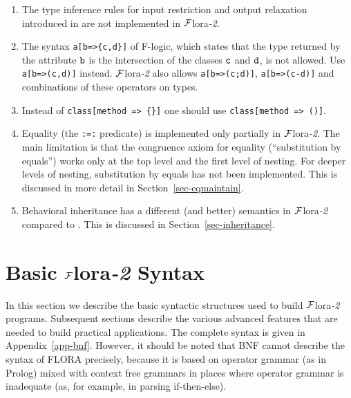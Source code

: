 \documentclass[11pt]{article}
\newcommand{\FLORA}{{\mbox{\sc ${\cal F}${lora}\rm\emph{-2}}}\xspace}
\newcommand{\fl}{\mbox{F-logic}\xspace}
\begin{document}
\begin{enumerate}
  The semantics of {\tt *=>} are
  characterized by the following logical entailments ($\phi \models \psi$
  means $\phi$ logically entails $\psi$):
  \begin{quote}
    {\tt X[M *=> T], Y::X $\models$ Y[M *=> T]}\\
    {\tt X[M *=> T], Y:X $\models$ Y[M => T]}
  \end{quote}
  which is analogous to the behavior of {\tt ->}.
\item The type inference rules for input restriction and output
  relaxation introduced in \cite{KLW95} are not implemented in \FLORA.
\item The syntax {\tt a[b=>\{c,d\}]} of \fl, which states that the type
  returned by the attribute $\tt b$ is the intersection of the classes $\tt c$ and
  $\tt d$, is not allowed. Use {\tt a[b=>(c,d)]} instead. \FLORA also allows
  {\tt a[b=>(c;d)]}, {\tt a[b=>(c-d)]} and combinations of these operators on
  types.
\item Instead of {\tt class[method => \{\}]}
  one should use {\tt class[method => ()]}.
\item Equality (the {\tt :=:} predicate) is implemented only partially in
  \FLORA. The main limitation is that the congruence axiom for equality
  (``substitution by equals'') works only at the top level and the first
  level of nesting.  For deeper levels of nesting, substitution by equals
  has not been implemented. This is discussed in more detail in
  Section~\ref{sec-eqmaintain}.
\item Behavioral inheritance has a different (and better) semantics in
  \FLORA compared to \cite{KLW95}.
  This is discussed in Section~\ref{sec-inheritance}.
\end{enumerate}



\section{Basic \FLORA Syntax}

In this section we describe the basic syntactic structures used to build
\FLORA programs. Subsequent sections describe the various advanced features
that are needed to build practical applications. The complete syntax is
given in Appendix~\ref{app-bnf}. However, it should be noted that BNF
cannot describe the syntax of FLORA precisely, because it is based on
operator grammar (as in Prolog) mixed with context free grammars in
places where operator grammar is inadequate (as, for example, in parsing
if-then-else).
\end{document}
